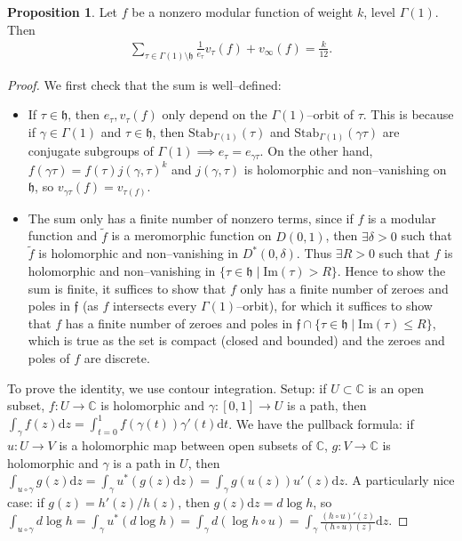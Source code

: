\documentclass{article}
\theoremstyle{definition}
\newtheorem{prop}[theorem]{Proposition}
\begin{document}
\begin{prop}
    Let $f$ be a nonzero modular function of weight $k$, level $\Gamma(1)$. Then 
    \begin{align*}
        \sum_{ \tau \in \Gamma(1)\setminus \mathfrak{h}}^{} \frac{1}{e_{\tau}}v_\tau(f) + v_\infty(f) = \frac{k}{12}.
    \end{align*}
\end{prop}
\begin{proof}
    We first check that the sum is well--defined: 
    \begin{itemize}
        \item If $\tau \in \mathfrak{h}$, then $e_\tau, v_{\tau}(f)$ only depend on the $\Gamma(1)$--orbit of $\tau$. This is because if $\gamma \in \Gamma(1)$ and $\tau \in \mathfrak{h}$, then $\text{Stab}_{\Gamma(1)}(\tau)$ and $\text{Stab}_{\Gamma(1)}(\gamma \tau)$ are conjugate subgroups of $\Gamma(1) \implies e_{\tau} = e_{\gamma \tau}$. On the other hand, $f(\gamma \tau) = f(\tau) j(\gamma, \tau)^k$ and $j(\gamma, \tau)$ is holomorphic and non--vanishing on $\mathfrak{h}$, so $v_{\gamma \tau}(f) = v_{\tau(f)}$.
        \item The sum only has a finite number of nonzero terms, since if $f$ is a modular function and $\tilde{f}$ is a meromorphic function on $D(0,1)$, then $\exists \delta > 0$ such that $\tilde{f}$ is holomorphic and non--vanishing in $D^*(0,\delta)$. Thus $\exists R > 0$ such that $f$ is holomorphic and non--vanishing in $\{\tau \in \mathfrak{h} \mid \text{Im}(\tau)>R\}$. Hence to show the sum is finite, it suffices to show that $f$ only has a finite number of zeroes and poles in $\mathfrak{f}$ (as $f$ intersects every $\Gamma(1)$--orbit), for which it suffices to show that $f$ has a finite number of zeroes and poles in $\mathfrak{f} \cap \{\tau \in \mathfrak{h} \mid  \text{Im}(\tau)\le R\}$, which is true as the set is compact (closed and bounded) and the zeroes and poles of $f$ are discrete.
    \end{itemize}
    To prove the identity, we use contour integration. Setup: if $U \subset \mathbb{C}$ is an open subset, $f : U \to \mathbb{C}$ is holomorphic and $\gamma:[0,1] \to U$ is a path, then $\int_{\gamma}^{} f(z)\mathrm{d}z = \int_{t=0}^{1} f(\gamma(t))\gamma'(t)\mathrm{d}t$. We have the pullback formula: if $u : U \to V$ is a holomorphic map between open subsets of $\mathbb{C}$, $g : V \to \mathbb{C}$ is holomorphic and $\gamma$ is a path in $U$, then $\int_{u \circ \gamma}^{} g(z)\mathrm{d}z = \int_{\gamma}^{} u^*(g(z)\mathrm{d}z) = \int_{\gamma}^{} g(u(z))u'(z)\mathrm{d}z$. A particularly nice case: if $g(z)=h'(z)/h(z)$, then $g(z)\mathrm{d}z = d \log h$, so $\int_{u \circ \gamma}^{}d \log h = \int_{\gamma}^{} u^*(d \log h) = \int_{\gamma}^{} d(\log h \circ u) = \int_{\gamma}^{} \frac{(h \circ u)'(z)}{(h \circ u)(z)}\mathrm{d}z$.
    \vspace{1mm}
     

\end{proof}
\end{document}
